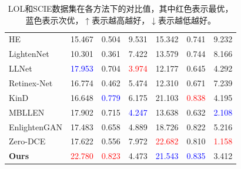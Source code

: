 \documentclass[CJK,aspectratio=169]{beamer}  %
\begin{document}
\begin{frame}
\begin{table}[!htbp]
{\begin{tabular}{>{\centering\arraybackslash}m{2.5cm}|c|c|c|c|c|c}
					HE             & 15.467 & 0.504 & 9.531 & 15.342 & 0.741 & 9.232 \\
					LightenNet     & 10.301 & 0.361 & 7.422 & 13.579 & 0.744 & 8.166 \\
					LLNet          & \textcolor{blue}{17.953} & 0.704 & \textcolor{red}{3.974} & 12.177 & 0.645 & 4.292 \\
					Retinex-Net    & 16.774 & 0.462 & 5.474 & 12.310 & 0.671 & 7.239 \\ 
					KinD 	          & 16.648 & \textcolor{blue}{0.779} & 6.175 & 21.103 & \textcolor{red}{0.838} & 4.195 \\
					MBLLEN         & 17.902 & 0.715 & \textcolor{blue}{4.247} & 13.638 & 0.632 & \textcolor{blue}{2.108} \\
					EnlightenGAN   & 17.483 & 0.658 & 4.889 & 18.726 & 0.822 & 5.216 \\
					Zero-DCE       & 17.622 & 0.556 & 7.972 & \textcolor{red}{22.682} & 0.810 & \textcolor{red}{1.158} \\
					\textbf{Ours}  & \textcolor{red}{22.780} & \textcolor{red}{0.823} & 4.473 & \textcolor{blue}{21.543} & \textcolor{blue}{0.835} & 3.412 \\
					\hline
					
				\end{tabular}
			}
			\captionsetup{font=scriptsize} %
			\caption{
				\tiny LOL和SCIE数据集在各方法下的对比值，其中红色表示最优，蓝色表示次优，$↑$表示越高越好，$↓$表示越低越好。
			} 
		\end{table}
		
%			
%			
%			
%			
%		
%			
%			
				
	\end{frame}
	
\end{document}
